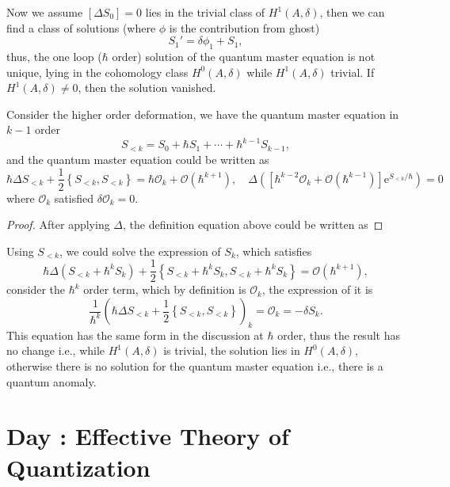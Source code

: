\documentclass[10pt]{article}
\begin{document}
Now we assume $[\Delta S_0] = 0$ lies in the trivial class of $ H^{1}(A, \delta)$, then we can find a class of solutions (where $ \phi$ is the contribution from ghost)
\begin{equation*}
  S_1' = \delta \phi_1 + S_1,
\end{equation*}
thus, the one loop ($ \hbar$ order) solution of the quantum master equation is not unique, lying in the cohomology class $ H^{0}(A,\delta)$ while $ H^{1}(A, \delta)$ trivial. If $ H^{1}(A, \delta) \neq 0$, then the solution vanished.

Consider the higher order deformation, we have the quantum master equation in $ k - 1$ order
\begin{equation*}
  S_{<k} = S_0 + \hbar S_1 + \cdots + \hbar^{k-1} S_{k-1},
\end{equation*}
and the quantum master equation could be written as
\begin{equation*}
  \hbar \Delta S_{<k} + \frac{1}{2} \left\{ S_{<k}, S_{<k} \right\} = \hbar \mathcal{O}_{k} + \mathcal{O}(\hbar^{k+1}), \quad \Delta \left( \left[ \hbar^{k-2} \mathcal{O}_{k} + \mathcal{O}(\hbar^{k-1}) \right] \mathrm{e}^{S_{<k} / \hbar} \right) = 0
\end{equation*}
where $ \mathcal{O}_{k}$ satisfied $ \delta \mathcal{O}_{k} = 0$.
\begin{proof}
  After applying $ \Delta$, the definition equation above could be written as
\end{proof}
Using $ S_{<k}$, we could solve the expression of $ S_k$, which satisfies
\begin{equation*}
  \hbar \Delta (S_{<k} + \hbar^{k} S_{k}) + \frac{1}{2} \left\{  S_{<k} + \hbar^{k} S_k, S_{<k} + \hbar^{k} S_k\right\} = \mathcal{O}(\hbar^{k+1}),
\end{equation*}
consider the $ \hbar^{k}$ order term, which by definition is $ \mathcal{O}_{k}$, the expression of it is
\begin{equation*}
  \frac{1}{\hbar^{k}}\left( \hbar \Delta S_{<k} + \frac{1}{2} \left\{ S_{<k}, S_{<k} \right\} \right)_{k} = \mathcal{O}_{k} = - \delta S_{k}.
\end{equation*}
This equation has the same form in the discussion at $ \hbar$ order, thus the result has no change i.e., while $ H^{1}(A, \delta)$ is trivial, the solution lies in $ H^{0}(A, \delta)$, otherwise there is no solution for the quantum master equation i.e., there is a quantum anomaly.

\section{Day : Effective Theory of Quantization}
\end{document}
